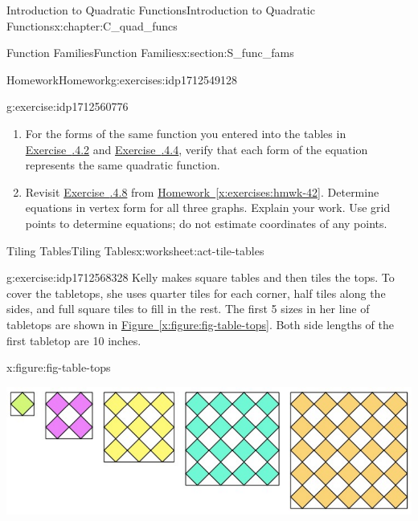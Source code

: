 \documentclass[oneside,10pt,]{book}
\newcommand{\xreffont}{\relax}
\numberwithin{equation}{chapter}
\begin{document}
\begin{chapterptx}{Introduction to Quadratic Functions}{}{Introduction to Quadratic Functions}{}{}{x:chapter:C_quad_funcs}
\begin{sectionptx}{Function Families}{}{Function Families}{}{}{x:section:S_func_fams}
\begin{exercises-subsection}{Homework}{}{Homework}{}{}{g:exercises:idp1712549128}
\begin{divisionexercise}{5}{}{}{g:exercise:idp1712560776}
\begin{enumerate}[font=\bfseries,label=(\alph*),ref=\alph*]
\item{}For the forms of the same function you entered into the tables in \hyperlink{x:exercise:exer-factored-eqs}{Exercise~{\xreffont 4.2.4.2}} and \hyperlink{x:exercise:exer-quad-funcs-stnd}{Exercise~{\xreffont 4.2.4.4}}, verify that each form of the equation represents the same quadratic function.%
\item{}Revisit \hyperlink{x:exercise:exer-3parabs}{Exercise~{\xreffont 4.2.4.8}} from \hyperref[x:exercises:hmwk-42]{Homework~{\xreffont\ref{x:exercises:hmwk-42}}}. Determine equations in vertex form for all three graphs. Explain your work. Use grid points to determine equations; do not estimate coordinates of any points.%
\end{enumerate}
\end{divisionexercise}%
\end{exercises-subsection}
%
%
\typeout{************************************************}
\typeout{************************************************}
%
\begin{worksheet-subsection}{Tiling Tables}{}{Tiling Tables}{}{}{x:worksheet:act-tile-tables}
\begin{divisionexercise}{1}{}{}{g:exercise:idp1712568328}%
Kelly makes square tables and then tiles the tops. To cover the tabletops, she uses quarter tiles for each corner, half tiles along the sides, and full square tiles to fill in the rest. The first 5 sizes in her line of tabletops are shown in \hyperref[x:figure:fig-table-tops]{Figure~{\xreffont\ref{x:figure:fig-table-tops}}}. Both side lengths of the first tabletop are 10 inches.%
\begin{figureptx}{}{x:figure:fig-table-tops}{}%
\begin{image}{0.1}{0.8}{0.1}%
\includegraphics[width=\linewidth]{external/table-tops.pdf}
\end{image}%
\tcblower
\end{figureptx}%
\begin{enumerate}[font=\bfseries,label=(\alph*),ref=\alph*]

\end{enumerate}
\end{divisionexercise}
\end{worksheet-subsection}
\end{sectionptx}
\end{chapterptx}
\end{document}
